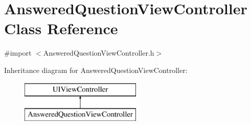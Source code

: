 \hypertarget{interface_answered_question_view_controller}{\section{Answered\-Question\-View\-Controller Class Reference}
\label{interface_answered_question_view_controller}
}


{\ttfamily \#import $<$Answered\-Question\-View\-Controller.\-h$>$}

Inheritance diagram for Answered\-Question\-View\-Controller\-:\begin{figure}[H]
\begin{center}
\leavevmode
\includegraphics[height=2.000000cm]{interface_answered_question_view_controller}
\end{center}
\end{figure}

